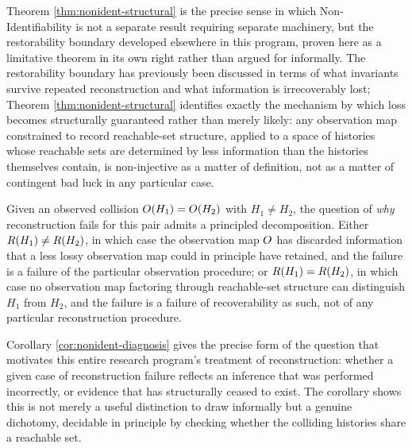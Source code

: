 Theorem \ref{thm:nonident-structural} is the precise sense in which
Non-Identifiability is not a separate result requiring separate
machinery, but the restorability boundary developed elsewhere in this
program, proven here as a limitative theorem in its own right rather
than argued for informally. The restorability boundary has previously
been discussed in terms of what invariants survive repeated
reconstruction and what information is irrecoverably lost; Theorem
\ref{thm:nonident-structural} identifies exactly the mechanism by which
loss becomes structurally guaranteed rather than merely likely: any
observation map constrained to record reachable-set structure, applied
to a space of histories whose reachable sets are determined by less
information than the histories themselves contain, is non-injective as
a matter of definition, not as a matter of contingent bad luck in any
particular case.

\begin{corollary}
\label{cor:nonident-diagnosis}
Given an observed collision $O(H_1) = O(H_2)$ with
$H_1 \neq H_2$, the question of \emph{why} reconstruction fails for this
pair admits a principled decomposition. Either $R(H_1) \neq
R(H_2)$, in which case the observation map $O$ has discarded
information that a less lossy observation map could in principle have
retained, and the failure is a failure of the particular observation
procedure; or $R(H_1) = R(H_2)$, in which case no observation
map factoring through reachable-set structure can distinguish $H_1$ from
$H_2$, and the failure is a failure of recoverability as such, not of
any particular reconstruction procedure.
\end{corollary}

Corollary \ref{cor:nonident-diagnosis} gives the precise form of the
question that motivates this entire research program's treatment of
reconstruction: whether a given case of reconstruction failure reflects
an inference that was performed incorrectly, or evidence that has
structurally ceased to exist. The corollary shows this is not merely a
useful distinction to draw informally but a genuine dichotomy, decidable
in principle by checking whether the colliding histories share a
reachable set.
